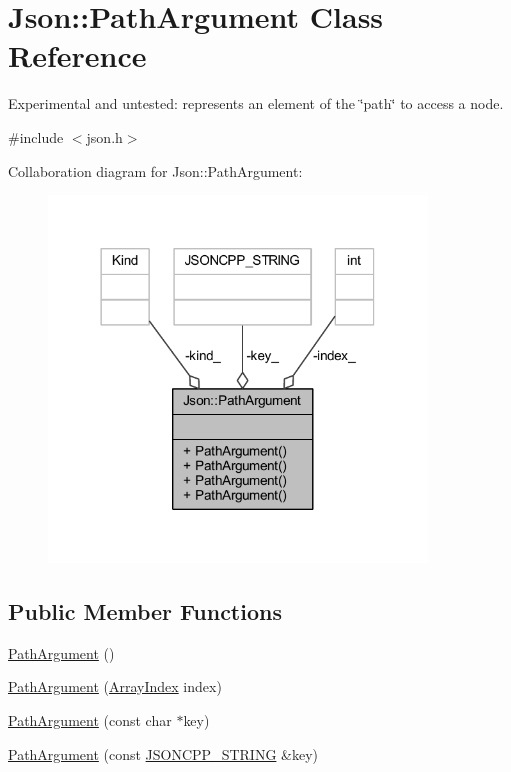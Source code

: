 \hypertarget{class_json_1_1_path_argument}{}\section{Json\+:\+:Path\+Argument Class Reference}
\label{class_json_1_1_path_argument}


Experimental and untested\+: represents an element of the \char`\"{}path\char`\"{} to access a node.  




{\ttfamily \#include $<$json.\+h$>$}



Collaboration diagram for Json\+:\+:Path\+Argument\+:\nopagebreak
\begin{figure}[H]
\begin{center}
\leavevmode
\includegraphics[width=285pt]{class_json_1_1_path_argument__coll__graph}
\end{center}
\end{figure}
\subsection*{Public Member Functions}
\begin{DoxyCompactItemize}
\item 
\hyperlink{class_json_1_1_path_argument_a3c96ed20c56a55eb76d37a11553c528e}{Path\+Argument} ()
\item 
\hyperlink{class_json_1_1_path_argument_a53c5b27143b161301b95fd544c139ecf}{Path\+Argument} (\hyperlink{namespace_json_a8048e741f2177c3b5d9ede4a5b8c53c2}{Array\+Index} index)
\item 
\hyperlink{class_json_1_1_path_argument_a9690417a8a40e6e49f2acdf6c9281345}{Path\+Argument} (const char $\ast$key)
\item 
\hyperlink{class_json_1_1_path_argument_ac15f25452124fbf21218897113015301}{Path\+Argument} (const \hyperlink{json_8h_a1e723f95759de062585bc4a8fd3fa4be}{J\+S\+O\+N\+C\+P\+P\+\_\+\+S\+T\+R\+I\+NG} \&key)
\end{DoxyCompactItemize}
